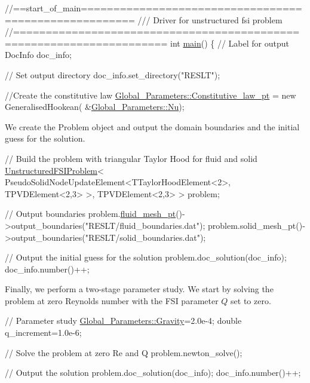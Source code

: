  
\begin{DoxyCodeInclude}
\textcolor{comment}{//==start\_of\_main======================================================}
\textcolor{comment}{/// Driver for unstructured fsi problem}
\textcolor{comment}{}\textcolor{comment}{//=====================================================================}
\textcolor{keywordtype}{int} \hyperlink{unstructured__two__d__fsi_8cc_ae66f6b31b5ad750f1fe042a706a4e3d4}{main}()
\{
 \textcolor{comment}{// Label for output}
 DocInfo doc\_info;
 
 \textcolor{comment}{// Set output directory}
 doc\_info.set\_directory(\textcolor{stringliteral}{"RESLT"});
 
 \textcolor{comment}{//Create the constitutive law}
 \hyperlink{namespaceGlobal__Parameters_adbd1f040f375c96fe56b3f475f7dbec2}{Global\_Parameters::Constitutive\_law\_pt} = \textcolor{keyword}{new} GeneralisedHookean(
  &\hyperlink{namespaceGlobal__Parameters_a20fccdcfa2c15ad8b951b9ada3bb1661}{Global\_Parameters::Nu});

\end{DoxyCodeInclude}


We create the {\ttfamily Problem} object and output the domain boundaries and the initial guess for the solution.


\begin{DoxyCodeInclude}
 
 \textcolor{comment}{// Build the problem with triangular Taylor Hood for fluid and solid}
 \hyperlink{classUnstructuredFSIProblem}{UnstructuredFSIProblem}<
 PseudoSolidNodeUpdateElement<TTaylorHoodElement<2>, TPVDElement<2,3> >, 
  TPVDElement<2,3> > problem;

 \textcolor{comment}{// Output boundaries }
 problem.\hyperlink{classUnstructuredFSIProblem_afe86a739cadf57036a0bf351ed9bc1a9}{fluid\_mesh\_pt}()->output\_boundaries(\textcolor{stringliteral}{"RESLT/fluid\_boundaries.dat"});
 problem.solid\_mesh\_pt()->output\_boundaries(\textcolor{stringliteral}{"RESLT/solid\_boundaries.dat"});
 
 \textcolor{comment}{// Output the initial guess for the solution}
 problem.doc\_solution(doc\_info);
 doc\_info.number()++;

\end{DoxyCodeInclude}


Finally, we perform a two-\/stage parameter study. We start by solving the problem at zero Reynolds number with the F\+SI parameter $ Q $ set to zero.


\begin{DoxyCodeInclude}
 
 \textcolor{comment}{// Parameter study}
 \hyperlink{namespaceGlobal__Parameters_a335000b5db4206486a116ae0468d2d0c}{Global\_Parameters::Gravity}=2.0e-4;
 \textcolor{keywordtype}{double} q\_increment=1.0e-6;

 \textcolor{comment}{// Solve the problem at zero Re and Q}
 problem.newton\_solve();
 
 \textcolor{comment}{// Output the solution}
 problem.doc\_solution(doc\_info);
 doc\_info.number()++;

\end{DoxyCodeInclude}


